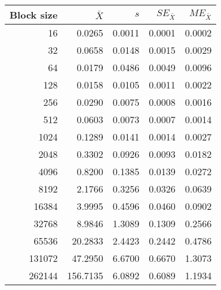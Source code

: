 \begin{tabular}{rrrrr}\toprule
{\small Block size} & $\bar{X}$ & $s$ & $SE_{\bar{X}}$ & $ME_{\bar{X}}$ \\\midrule
16 & 0.0265 & 0.0011 & 0.0001 & 0.0002\\
32 & 0.0658 & 0.0148 & 0.0015 & 0.0029\\
64 & 0.0179 & 0.0486 & 0.0049 & 0.0096\\
128 & 0.0158 & 0.0105 & 0.0011 & 0.0022\\
256 & 0.0290 & 0.0075 & 0.0008 & 0.0016\\
512 & 0.0603 & 0.0073 & 0.0007 & 0.0014\\
1024 & 0.1289 & 0.0141 & 0.0014 & 0.0027\\
2048 & 0.3302 & 0.0926 & 0.0093 & 0.0182\\
4096 & 0.8200 & 0.1385 & 0.0139 & 0.0272\\
8192 & 2.1766 & 0.3256 & 0.0326 & 0.0639\\
16384 & 3.9995 & 0.4596 & 0.0460 & 0.0902\\
32768 & 8.9846 & 1.3089 & 0.1309 & 0.2566\\
65536 & 20.2833 & 2.4423 & 0.2442 & 0.4786\\
131072 & 47.2950 & 6.6700 & 0.6670 & 1.3073\\
262144 & 156.7135 & 6.0892 & 0.6089 & 1.1934\\
\bottomrule
\end{tabular}
